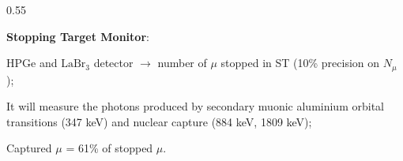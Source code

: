 \documentclass{beamer}
\begin{document}
\begin{frame}
\begin{columns}
\begin{column}{0.55\framewidth}
\begin{figure}[h]
        \end{figure}
        \textbf{Stopping Target Monitor}:
            \begin{itemize}
                {\small  \item HPGe and  $ \text{LaBr}_3$ detector $\rightarrow$ number of $\mu$ stopped in ST (10\% precision on $N_\mu$);
                \item It will measure the photons produced by secondary muonic aluminium orbital transitions (347 keV) and nuclear capture (884 keV, 1809 keV);
                \item Captured $\mu$ = 61\% of stopped $\mu$.
                }
            \end{itemize}
                         
            \end{column}
    \end{columns}
\end{frame}
\end{document}

